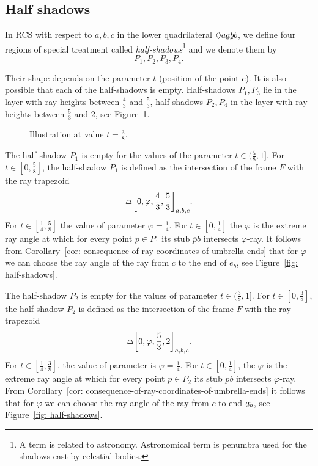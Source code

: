 \subsection{Half shadows}
In RCS with respect to $a,b,c$ in the lower quadrilateral $\quadsym{a\undersym{a}\undersym{b}b}$, we define four regions of special treatment called \textit{half-shadows}\footnote{A term is related to astronomy. Astronomical term is penumbra used for the shadows cast by celestial bodies.} and we denote them by
$$
P_{1},P_{2},P_{3},P_{4}.
$$

Their shape depends on the parameter $t$ (position of the point $c$). It is also possible that each of the half-shadows is empty.
Half-shadows $P_{1}, P_{3}$ lie in the layer with ray heights between $\frac{4}{3}$ and $\frac{5}{3}$, half-shadows $P_{2}, P_{4}$ in the layer with ray heights between $\frac{5}{3}$ and $2$, see Figure~\ref{fig: half-shadows-2}.

\begin{figure}
\begin{center}

\end{center}
\caption{Illustration at value $t = \frac{3}{8}$.}
\label{fig: half-shadows-2}
\end{figure}

The half-shadow $P_{1}$ is empty for the values of the parameter $t \in (\frac{5}{8}, 1]$. For $t \in [0, \frac{5}{8}]$, the half-shadow $P_{1}$ is defined as the intersection of the frame $F$ with the ray trapezoid
$$
\tpz{\left[ 0,\varphi,\frac{4}{3},\frac{5}{3} \right]_{a,b,c} }.
$$
For $t \in [\frac{1}{4},\frac{5}{8}]$ the value of parameter $\varphi = \frac{1}{4}$. For $t \in [0, \frac{1}{4}]$ the $\varphi$ is the extreme ray angle at which for every point $p \in P_{1}$ its stub $\overline{p}b$ intersects $\varphi$-ray. It follows from Corollary~\ref{cor: consequence-of-ray-coordinates-of-umbrella-ends} that for $\varphi$ we can choose the ray angle of the ray from $c$ to the end of $e_{b}$, see Figure~\ref{fig: half-shadows}.

The half-shadow $P_{2}$ is empty for the values of parameter $t \in (\frac{3}{8}, 1]$. For $t \in [0, \frac{3}{8}]$, the half-shadow $P_{2}$ is defined as the intersection of the frame $F$ with the ray trapezoid
$$
\tpz{\left[ 0,\varphi,\frac{5}{3},2 \right]_{a,b,c} }.
$$
For $t \in [\frac{1}{4},\frac{3}{8}]$, the value of parameter is $\varphi = \frac{1}{4}$. For $t \in [0, \frac{1}{4}]$, the $\varphi$ is the extreme ray angle at which for every point $p \in P_{2}$ its stub $\overline{p}b$ intersects $\varphi$-ray. From Corollary~\ref{cor: consequence-of-ray-coordinates-of-umbrella-ends} it follows that for $\varphi$ we can choose the ray angle of the ray from $c$ to end $\undersym{a}_{b}$, see Figure~\ref{fig: half-shadows}.

